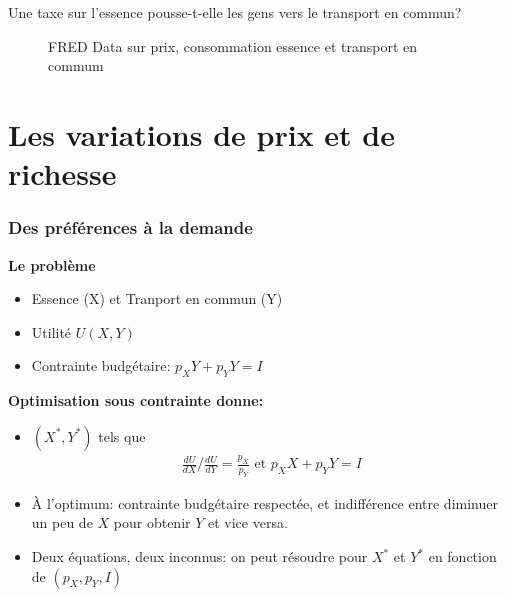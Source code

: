 \documentclass[handout]{beamer}
\begin{document}
\begin{frame}{Une taxe sur l'essence pousse-t-elle les gens vers le transport en commun?}
\begin{figure}
\caption{FRED Data sur prix, consommation essence et transport en commum}
\end{figure}


\end{frame}

\section{Les variations de prix et de richesse}

\begin{frame}\frametitle{Des préférences à la demande}
\textbf{Le problème}
\begin{itemize}
\item Essence (X) et Tranport en commun (Y)
\item Utilité $U(X,Y)$
\item Contrainte budgétaire: $p_X Y+ p_Y Y = I$
\end{itemize}

\textbf{Optimisation sous contrainte donne:}
\begin{itemize}
\item  $(X^*, Y^*)$ tels que \begin{eqnarray*} \frac{dU}{dX}\Bigg/\frac{dU}{dY} = \frac{p_X}{p_Y} \textrm{ et }
p_X X + p_Y Y = I
\end{eqnarray*}

\item  À l'optimum: contrainte budgétaire respectée, et indifférence entre diminuer un peu de $X$ pour obtenir $Y$ et vice versa.
\item Deux équations, deux inconnus: on peut résoudre pour $X^*$ et $Y^*$ en fonction de $(p_X,p_Y,I)$

\end{itemize}
\end{frame}
\end{document}
